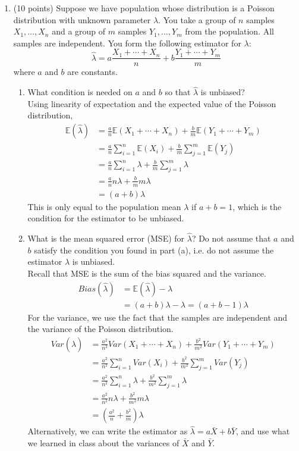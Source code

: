 \documentclass[12pt]{article}
\def\E{{\mathbb E}}
\begin{document}
\begin{enumerate}
\pagebreak

\item (10 points) Suppose we have population whose distribution is a Poisson distribution with unknown parameter $\lambda$. You take a group of $n$ samples $X_1, \dots, X_n$ and a group of $m$ samples $Y_1, \dots, Y_m$ from the population. All samples are independent. You form the following estimator for $\lambda$:
\[
\hat{\lambda} = a \frac{X_1 + \cdots + X_n}{n} + b \frac{Y_1 + \cdots + Y_m}{m} 
\]
where $a$ and $b$ are constants.
\begin{enumerate}
\item What condition is needed on $a$ and $b$ so that $\hat{\lambda}$ is unbiased?\\

Using linearity of expectation and the expected value of the Poisson distribution,
\begin{align*}
\E( \hat{\lambda} ) &= \frac{a}{n} \E( X_1 + \cdots + X_n ) + \frac{b}{m} \E( Y_1 + \cdots + Y_m )\\
&= \frac{a}{n} \sum_{i=1}^n \E(X_i) + \frac{b}{m} \sum_{j=1}^m \E(Y_j)\\
&= \frac{a}{n} \sum_{i=1}^n \lambda + \frac{b}{m} \sum_{j=1}^m \lambda\\
&= \frac{a}{n} n \lambda + \frac{b}{m} m \lambda\\
&= (a + b) \lambda
\end{align*}
This is only equal to the population mean $\lambda$ if $a + b = 1$, which is the condition for the estimator to be unbiased.

\item What is the mean squared error (MSE) for $\hat{\lambda}$? Do not assume that $a$ and $b$ satisfy the condition you found in part (a), i.e. do not assume the estimator $\hat{\lambda}$ is unbiased.\\

Recall that MSE is the sum of the bias squared and the variance.
\begin{align*}
Bias(\hat{\lambda}) &= \E( \hat{\lambda} ) - \lambda\\
&= (a + b) \lambda - \lambda = (a + b - 1) \lambda
\end{align*}
For the variance, we use the fact that the samples are independent and the variance of the Poisson distribution.
\begin{align*}
Var( \hat{\lambda} ) &= \frac{a^2}{n^2} Var( X_1 + \cdots + X_n ) + \frac{b^2}{m^2 } Var( Y_1 + \cdots + Y_m )\\
&= \frac{a^2}{n^2} \sum_{i=1}^n Var(X_i) + \frac{b^2}{m^2} \sum_{j=1}^m Var(Y_j)\\
&= \frac{a^2}{n^2} \sum_{i=1}^n \lambda + \frac{b^2}{m^2} \sum_{j=1}^m \lambda\\
&= \frac{a^2}{n^2} n \lambda + \frac{b^2}{m^2} m \lambda\\
&= \left( \frac{a^2}{n} + \frac{b^2}{m} \right) \lambda
\end{align*}
Alternatively, we can write the estimator as $\hat{\lambda} = a \bar{X} + b \bar{Y}$, and use what we learned in class about the variances of $\bar{X}$ and $\bar{Y}$.\\


\end{enumerate}
\end{enumerate}
\end{document}
